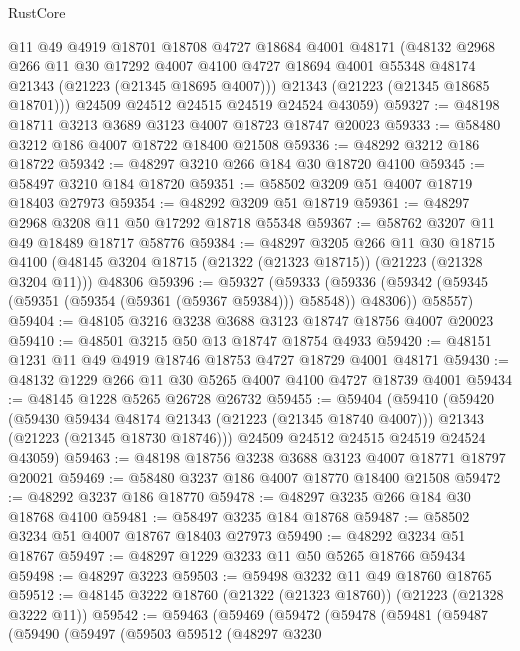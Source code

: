 \begin{lexlean}{RustCore}
\begin{coremodule}
        @11
        @49
        @4919
        @18701
        @18708
        @4727
        @18684
        @4001
        @48171
        (@48132
          @2968
          @266
          @11
          @30
          @17292
          @4007
          @4100
          @4727
          @18694
          @4001
          @55348
          @48174
          @21343
          (@21223 (@21345 @18695 @4007)))
        @21343
        (@21223 (@21345 @18685 @18701)))
      @24509
      @24512
      @24515
      @24519
      @24524
      @43059)
@59327 := @48198 @18711 @3213 @3689 @3123 @4007 @18723 @18747 @20023
@59333 := @58480 @3212 @186 @4007 @18722 @18400 @21508
@59336 := @48292 @3212 @186 @18722
@59342 := @48297 @3210 @266 @184 @30 @18720 @4100
@59345 := @58497 @3210 @184 @18720
@59351 := @58502 @3209 @51 @4007 @18719 @18403 @27973
@59354 := @48292 @3209 @51 @18719
@59361 := @48297 @2968 @3208 @11 @50 @17292 @18718 @55348
@59367 := @58762 @3207 @11 @49 @18489 @18717 @58776
@59384 := @48297
    @3205
    @266
    @11
    @30
    @18715
    @4100
    (@48145 @3204 @18715 (@21322 (@21323 @18715)) (@21223 (@21328 @3204 @11)))
    @48306
@59396 := @59327
    (@59333
      (@59336 (@59342 (@59345 (@59351 (@59354 (@59361 (@59367 @59384))) @58548)) @48306))
      @58557)
@59404 := @48105 @3216 @3238 @3688 @3123 @18747 @18756 @4007 @20023
@59410 := @48501 @3215 @50 @13 @18747 @18754 @4933
@59420 := @48151 @1231 @11 @49 @4919 @18746 @18753 @4727 @18729 @4001 @48171
@59430 := @48132 @1229 @266 @11 @30 @5265 @4007 @4100 @4727 @18739 @4001
@59434 := @48145 @1228 @5265 @26728 @26732
@59455 := @59404
    (@59410
      (@59420
        (@59430 @59434 @48174 @21343 (@21223 (@21345 @18740 @4007)))
        @21343
        (@21223 (@21345 @18730 @18746)))
      @24509
      @24512
      @24515
      @24519
      @24524
      @43059)
@59463 := @48198 @18756 @3238 @3688 @3123 @4007 @18771 @18797 @20021
@59469 := @58480 @3237 @186 @4007 @18770 @18400 @21508
@59472 := @48292 @3237 @186 @18770
@59478 := @48297 @3235 @266 @184 @30 @18768 @4100
@59481 := @58497 @3235 @184 @18768
@59487 := @58502 @3234 @51 @4007 @18767 @18403 @27973
@59490 := @48292 @3234 @51 @18767
@59497 := @48297 @1229 @3233 @11 @50 @5265 @18766 @59434
@59498 := @48297 @3223
@59503 := @59498 @3232 @11 @49 @18760 @18765
@59512 := @48145 @3222 @18760 (@21322 (@21323 @18760)) (@21223 (@21328 @3222 @11))
@59542 := @59463
    (@59469
      (@59472
        (@59478
          (@59481
            (@59487
              (@59490
                (@59497
                  (@59503
                    @59512
                    (@48297
                      @3230

\end{coremodule}
\end{lexlean}
